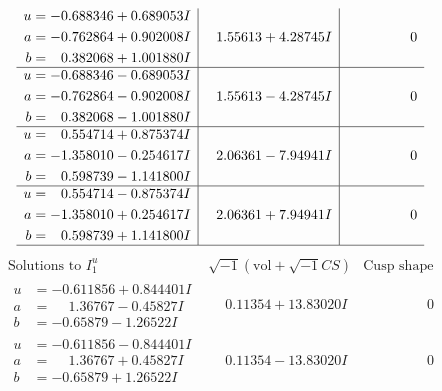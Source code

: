 \documentclass[1p]{elsarticle_modified}
\theoremstyle{definition}
\newcommand{\I}{\sqrt{-1}}
\begin{document}
$$\begin{array}{c|c|c}
\begin{aligned}
u &= -0.688346 + 0.689053 I \\
a &= -0.762864 + 0.902008 I \\
b &= \phantom{-}0.382068 + 1.001880 I\end{aligned}
 & \phantom{-}1.55613 + 4.28745 I & \phantom{-0.000000 } 0 \\ \hline\begin{aligned}
u &= -0.688346 - 0.689053 I \\
a &= -0.762864 - 0.902008 I \\
b &= \phantom{-}0.382068 - 1.001880 I\end{aligned}
 & \phantom{-}1.55613 - 4.28745 I & \phantom{-0.000000 } 0 \\ \hline\begin{aligned}
u &= \phantom{-}0.554714 + 0.875374 I \\
a &= -1.358010 - 0.254617 I \\
b &= \phantom{-}0.598739 - 1.141800 I\end{aligned}
 & \phantom{-}2.06361 - 7.94941 I & \phantom{-0.000000 } 0 \\ \hline\begin{aligned}
u &= \phantom{-}0.554714 - 0.875374 I \\
a &= -1.358010 + 0.254617 I \\
b &= \phantom{-}0.598739 + 1.141800 I\end{aligned}
 & \phantom{-}2.06361 + 7.94941 I & \phantom{-0.000000 } 0\\
 \hline 
 \end{array}$$\newpage$$\begin{array}{c|c|c}  
\text{Solutions to }I^u_{1}& \I (\text{vol} + \sqrt{-1}CS) & \text{Cusp shape}\\
 \hline 
\begin{aligned}
u &= -0.611856 + 0.844401 I \\
a &= \phantom{-}1.36767 - 0.45827 I \\
b &= -0.65879 - 1.26522 I\end{aligned}
 & \phantom{-}0.11354 + 13.83020 I & \phantom{-0.000000 } 0 \\ \hline\begin{aligned}
u &= -0.611856 - 0.844401 I \\
a &= \phantom{-}1.36767 + 0.45827 I \\
b &= -0.65879 + 1.26522 I\end{aligned}
 & \phantom{-}0.11354 - 13.83020 I & \phantom{-0.000000 } 0 \\ \hline\begin{aligned}

\end{aligned}
\end{array}$$
\end{document}
